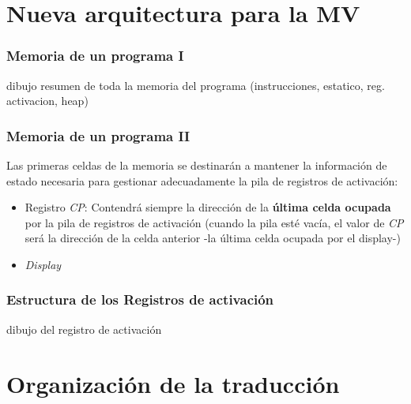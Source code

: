 \documentclass[hyperref={pdfpagelabels=false},tree-dvips]{beamer}
\begin{document}
\section{Nueva arquitectura para la MV}
\begin{frame}[fragile]
\frametitle{Memoria de un programa I}

dibujo resumen de toda la memoria del programa (instrucciones, estatico, reg. activacion, heap)

\end{frame}
\begin{frame}[fragile]
\frametitle{Memoria de un programa II}

Las primeras celdas de la memoria se destinarán a mantener la información de estado necesaria para gestionar adecuadamente la pila de registros de activación:
\begin{itemize}[<+->]%
	\item Registro \emph{CP}: Contendrá siempre la dirección de la \textbf{última celda ocupada} por la pila de registros de activación (cuando la pila esté vacía, el valor de \emph{CP} será la dirección de la celda anterior -la última celda ocupada por el display-)
	\item \emph{Display}
\end{itemize}

\end{frame}
\begin{frame}[fragile]
\frametitle{Estructura de los Registros de activación}

dibujo del registro de activación

\end{frame}
\section{Organización de la traducción}
\end{document}
